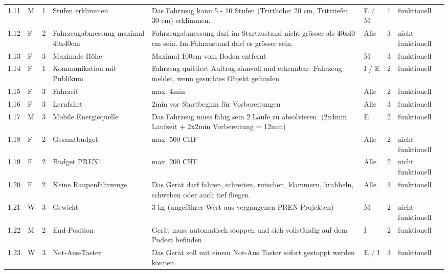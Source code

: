\begin{longtable}[]{@{}lllp{2cm}p{5cm}llp{2cm}@{}}
1.11 & M & 1 & Stufen erklimmen & Das Fahrzeug kann 5 - 10 Stufen
(Tritthöhe: 20 cm, Tritttiefe: 30 cm) erklimmen. & E / M & 1 &
funktionell\tabularnewline

1.12 & F & 2 & Fahrzeugabmessung maximal 40x40cm & Fahrzeugabmessung darf
im Startzustand nicht grösser als 40x40 cm sein. Im Fahrzustand darf es
grösser sein. & Alle & 3 & nicht \hbox{funktionell}\tabularnewline

1.13 & F & 3 & Maximale Höhe & Maximal 100cm vom Boden entfernt & M & 3
& funktionell\tabularnewline

1.14 & F & 1 & Kommunikation mit Publikum &
Fahrzeug quittiert Auftrag sinnvoll und
erkennbar- Fahrzeug meldet, wenn gesuchtes Objekt
gefunden & I / E & 2 & funktionell\tabularnewline

1.15 & F & 3 & Fahrzeit & max. 4min & Alle & 2 &
funktionell\tabularnewline

1.16 & F & 3 & Lernfahrt & 2min vor Startbeginn für Vorbereitungen &
Alle & 3 & funktionell\tabularnewline

1.17 & M & 3 & Mobile Energiequelle & Das Fahrzeug muss fähig sein 2
Läufe zu absolvieren. (2x4min Laufzeit + 2x2min Vorbereitung = 12min) & E &
2 & funktionell\tabularnewline

1.18 & F & 2 & Gesamtbudget & max. 500 CHF & Alle & 2 & nicht
\hbox{funktionell}\tabularnewline

1.19 & F & 2 & Budget PREN1 & max. 200 CHF & Alle & 2 & nicht
\hbox{funktionell}\tabularnewline

1.20 & F & 2 & Keine Raupenfahrzeuge & Das Gerät darf fahren, schreiten,
rutschen, klammern, krabbeln, schweben oder auch tief fliegen. & Alle &
3 & funktionell\tabularnewline

1.21 & W & 3 & Gewicht & 3 kg (ungefährer Wert aus vergangenen
PREN-Projekten) & M & 2 & nicht \hbox{funktionell}\tabularnewline

1.22 & M & 2 & End-Position & Gerät muss automatisch stoppen und sich
vollständig auf dem Podest befinden. & I & 2 &
funktionell\tabularnewline

1.23 & W & 3 & Not-Aus-Taster & Das Gerät soll mit einem Not-Aus Taster
sofort gestoppt werden können. & E / I & 3 & funktionell\tabularnewline

\end{longtable}
\normalsize